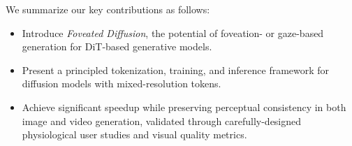 We summarize our key contributions as follows:

\begin{itemize}
    \item Introduce \emph{Foveated Diffusion}, the potential of foveation- or gaze-based generation for DiT-based generative models.
    \item Present a principled tokenization, training, and inference framework for diffusion models with mixed-resolution tokens.
    \item Achieve significant speedup while preserving perceptual consistency in both image and video generation, validated through carefully-designed physiological user studies and visual quality metrics.
\end{itemize}







    
    

    
